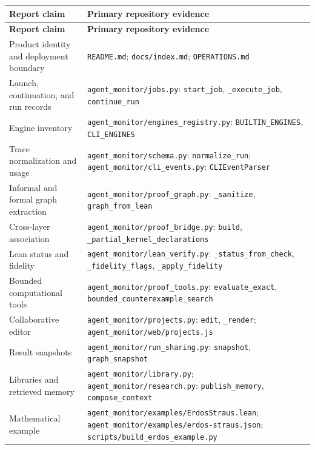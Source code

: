 \documentclass[10pt,letterpaper]{article}
\begin{document}
\begingroup\small
\setlength{\tabcolsep}{4pt}
\begin{longtable}{>{\raggedright\arraybackslash}p{0.31\dimexpr\linewidth-4\tabcolsep\relax}>{\raggedright\arraybackslash}p{0.69\dimexpr\linewidth-4\tabcolsep\relax}}
\toprule
\textbf{Report claim} & \textbf{Primary repository evidence} \\
\midrule\endfirsthead
\toprule
\textbf{Report claim} & \textbf{Primary repository evidence} \\
\midrule\endhead
\bottomrule\endfoot
Product identity and deployment boundary & \nolinkurl{README.md}; \nolinkurl{docs/index.md}; \nolinkurl{OPERATIONS.md} \\
Launch, continuation, and run records & \nolinkurl{agent_monitor/jobs.py}: \nolinkurl{start_job}, \nolinkurl{_execute_job}, \nolinkurl{continue_run} \\
Engine inventory & \nolinkurl{agent_monitor/engines_registry.py}: \nolinkurl{BUILTIN_ENGINES}, \nolinkurl{CLI_ENGINES} \\
Trace normalization and usage & \nolinkurl{agent_monitor/schema.py}: \nolinkurl{normalize_run}; \nolinkurl{agent_monitor/cli_events.py}: \nolinkurl{CLIEventParser} \\
Informal and formal graph extraction & \nolinkurl{agent_monitor/proof_graph.py}: \nolinkurl{_sanitize}, \nolinkurl{graph_from_lean} \\
Cross-layer association & \nolinkurl{agent_monitor/proof_bridge.py}: \nolinkurl{build}, \nolinkurl{_partial_kernel_declarations} \\
Lean status and fidelity & \nolinkurl{agent_monitor/lean_verify.py}: \nolinkurl{_status_from_check}, \nolinkurl{_fidelity_flags}, \nolinkurl{_apply_fidelity} \\
Bounded computational tools & \nolinkurl{agent_monitor/proof_tools.py}: \nolinkurl{evaluate_exact}, \nolinkurl{bounded_counterexample_search} \\
Collaborative editor & \nolinkurl{agent_monitor/projects.py}: \nolinkurl{edit}, \nolinkurl{_render}; \nolinkurl{agent_monitor/web/projects.js} \\
Result snapshots & \nolinkurl{agent_monitor/run_sharing.py}: \nolinkurl{snapshot}, \nolinkurl{graph_snapshot} \\
Libraries and retrieved memory & \nolinkurl{agent_monitor/library.py}; \nolinkurl{agent_monitor/research.py}: \nolinkurl{publish_memory}, \nolinkurl{compose_context} \\
Mathematical example & \nolinkurl{agent_monitor/examples/ErdosStraus.lean}; \nolinkurl{agent_monitor/examples/erdos-straus.json}; \nolinkurl{scripts/build_erdos_example.py} \\

\end{longtable}
\end{document}
